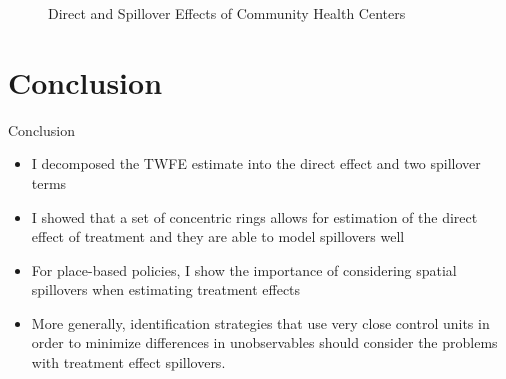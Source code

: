 \documentclass[aspectratio=169]{beamer}
\begin{document}
\begin{frame}
    \begin{figure}[tb!]
        \caption{Direct and Spillover Effects of Community Health Centers}
        \begin{center}
        \end{center}
    \end{figure}
\end{frame}

\section{Conclusion}

\begin{frame}{Conclusion}
    \begin{itemize}
        \item I decomposed the TWFE estimate into the direct effect and two spillover terms
        
        \item I showed that a set of concentric rings allows for estimation of the direct effect of treatment and they are able to model spillovers well
        
        \item For place-based policies, I show the importance of considering spatial spillovers when estimating treatment effects
        
        \item More generally, identification strategies that use very close control units in order to minimize differences in unobservables should consider the problems with treatment effect spillovers.
    \end{itemize}
\end{frame}
\end{document}
